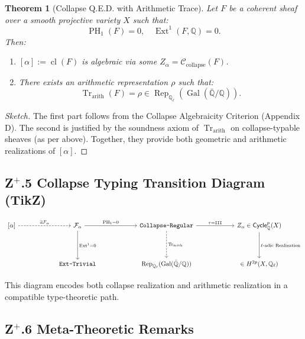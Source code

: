 \documentclass[11pt]{article}
\newtheorem{theorem}{Theorem}[section]
\DeclareMathOperator{\Ext}{Ext}
\DeclareMathOperator{\PH}{PH}
\begin{document}
\begin{theorem}[Collapse Q.E.D. with Arithmetic Trace]
Let $F$ be a coherent sheaf over a smooth projective variety $X$ such that:
\[
\PH_1(F) = 0, \quad \Ext^1(F, \mathbb{Q}) = 0.
\]
Then:
\begin{enumerate}
  \item $[\alpha] := \operatorname{cl}(F)$ is algebraic via some $Z_\alpha = \mathcal{C}_{\text{collapse}}(F)$.
  \item There exists an arithmetic representation $\rho$ such that:
  \[
  \operatorname{Tr}_{\mathrm{arith}}(F) = \rho \in \operatorname{Rep}_{\mathbb{Q}_\ell}(\operatorname{Gal}(\bar{\mathbb{Q}}/\mathbb{Q})).
  \]
\end{enumerate}
\end{theorem}

\begin{proof}[Sketch]
The first part follows from the Collapse Algebraicity Criterion (Appendix D). The second is justified by the soundness axiom of $\operatorname{Tr}_{\mathrm{arith}}$ on collapse-typable sheaves (as per above). Together, they provide both geometric and arithmetic realizations of $[\alpha]$.
\end{proof}

\subsection*{Z$^+$.5 Collapse Typing Transition Diagram (TikZ)}

\[
\begin{tikzcd}[row sep=4em, column sep=6em]
[\alpha] \arrow[r, dashed, "\exists \mathcal{F}_\alpha"] &
\mathcal{F}_\alpha \arrow[r, "\PH_1 = 0", above] \arrow[d, "\Ext^1 = 0", left] &
\texttt{Collapse-Regular} \arrow[r, "\tau = \texttt{III}"] \arrow[d, dashed, "\operatorname{Tr}_{\mathrm{arith}}"] &
Z_\alpha \in \mathsf{Cycle}^p_{\mathbb{Q}}(X) \arrow[d, "\ell\text{-adic Realization}"] \\
& \texttt{Ext-Trivial} &
\operatorname{Rep}_{\mathbb{Q}_\ell}(\operatorname{Gal}(\bar{\mathbb{Q}}/\mathbb{Q})) &
[\alpha] \in H^{2p}(X, \mathbb{Q}_\ell)
\end{tikzcd}
\]

This diagram encodes both collapse realization and arithmetic realization in a compatible type-theoretic path.

\subsection*{Z$^+$.6 Meta-Theoretic Remarks}
\end{document}
